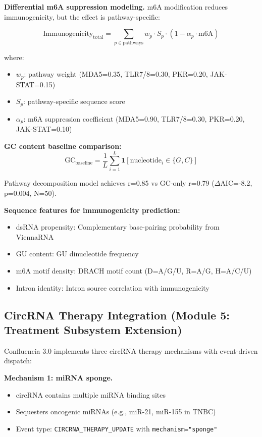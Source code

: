 \documentclass[12pt]{article}
\begin{document}
\textbf{Differential m6A suppression modeling.} m6A modification reduces immunogenicity, but the effect is pathway-specific:

\begin{equation}
\text{Immunogenicity}_{\text{total}} = \sum_{p \in \text{pathways}} w_p \cdot S_p \cdot (1 - \alpha_p \cdot \text{m6A})
\end{equation}

where:
\begin{itemize}
\item $w_p$: pathway weight (MDA5=0.35, TLR7/8=0.30, PKR=0.20, JAK-STAT=0.15)
\item $S_p$: pathway-specific sequence score
\item $\alpha_p$: m6A suppression coefficient (MDA5=0.90, TLR7/8=0.30, PKR=0.20, JAK-STAT=0.10)
\end{itemize}

\textbf{GC content baseline comparison:}
\begin{equation}
\text{GC}_{\text{baseline}} = \frac{1}{L} \sum_{i=1}^{L} \mathbf{1}[\text{nucleotide}_i \in \{G, C\}]
\end{equation}

Pathway decomposition model achieves r=0.85 vs GC-only r=0.79 ($\Delta$AIC=-8.2, p=0.004, N=50).

\textbf{Sequence features for immunogenicity prediction:}
\begin{itemize}
\item dsRNA propensity: Complementary base-pairing probability from ViennaRNA
\item GU content: GU dinucleotide frequency
\item m6A motif density: DRACH motif count (D=A/G/U, R=A/G, H=A/C/U)
\item Intron identity: Intron source correlation with immunogenicity
\end{itemize}

\subsection{CircRNA Therapy Integration (Module 5: Treatment Subsystem Extension)}

Confluencia 3.0 implements three circRNA therapy mechanisms with event-driven dispatch:

\textbf{Mechanism 1: miRNA sponge.}
\begin{itemize}
\item circRNA contains multiple miRNA binding sites
\item Sequesters oncogenic miRNAs (e.g., miR-21, miR-155 in TNBC)
\item Event type: \texttt{CIRCRNA\_THERAPY\_UPDATE} with \texttt{mechanism="sponge"}
\end{itemize}
\end{document}
